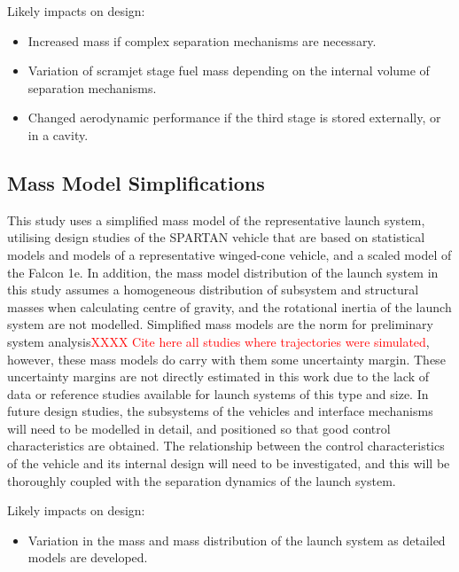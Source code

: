 
Likely impacts on design:
\begin{itemize}[noitemsep,topsep=0pt]
	\item Increased mass if complex separation mechanisms are necessary.
	\item Variation of scramjet stage fuel mass depending on the internal volume of separation mechanisms. 
	\item Changed aerodynamic performance if the third stage is stored externally, or in a cavity. 
\end{itemize}


\subsection{Mass Model Simplifications}

This study uses a simplified mass model of the representative launch system, utilising design studies of the SPARTAN vehicle\cite{Preller2017b} that are based on statistical models and models of a representative winged-cone vehicle\cite{Preller2018}, and a scaled model of the Falcon 1e\cite{Vehicle2008}. In addition, the mass model distribution of the launch system in this study assumes a homogeneous distribution of subsystem and structural masses when calculating centre of gravity, and the rotational inertia of the launch system are not modelled.
Simplified mass models are the norm for preliminary system analysis\textcolor{red}{XXXX Cite here all studies where trajectories were simulated}, however, these mass models do carry with them some uncertainty margin. These uncertainty margins are not directly estimated in this work due to the lack of data or reference studies available for launch systems of this type and size. 
In future design studies, the subsystems of the vehicles and interface mechanisms will need to be modelled in detail, and positioned so that good control characteristics are obtained. The relationship between the control characteristics of the vehicle and its internal design will need to be investigated, and this will be thoroughly coupled with the separation dynamics of the launch system. 

Likely impacts on design:
\begin{itemize}[noitemsep,topsep=0pt]
	\item Variation in the mass and mass distribution of the launch system as detailed models are developed. 
\end{itemize}

